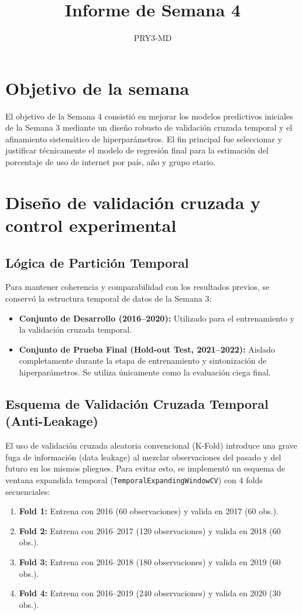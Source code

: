 \documentclass[12pt,a4paper]{article}
\title{Informe de Semana 4}
\author{PRY3-MD}
\date{}
\begin{document}
\maketitle

\section{Objetivo de la semana}

El objetivo de la Semana 4 consistió en mejorar los modelos predictivos iniciales de la Semana 3 mediante un diseño robusto de validación cruzada temporal y el afinamiento sistemático de hiperparámetros. El fin principal fue seleccionar y justificar técnicamente el modelo de regresión final para la estimación del porcentaje de uso de internet por país, año y grupo etario.

\section{Diseño de validación cruzada y control experimental}

\subsection{Lógica de Partición Temporal}
Para mantener coherencia y comparabilidad con los resultados previos, se conservó la estructura temporal de datos de la Semana 3:
\begin{itemize}
    \item \textbf{Conjunto de Desarrollo (2016--2020):} Utilizado para el entrenamiento y la validación cruzada temporal.
    \item \textbf{Conjunto de Prueba Final (Hold-out Test, 2021--2022):} Aislado completamente durante la etapa de entrenamiento y sintonización de hiperparámetros. Se utiliza únicamente como la evaluación ciega final.
\end{itemize}

\subsection{Esquema de Validación Cruzada Temporal (Anti-Leakage)}
El uso de validación cruzada aleatoria convencional (K-Fold) introduce una grave fuga de información (data leakage) al mezclar observaciones del pasado y del futuro en los mismos pliegues. Para evitar esto, se implementó un esquema de ventana expandida temporal (\texttt{TemporalExpandingWindowCV}) con 4 folds secuenciales:
\begin{enumerate}
    \item \textbf{Fold 1:} Entrena con 2016 (60 observaciones) y valida en 2017 (60 obs.).
    \item \textbf{Fold 2:} Entrena con 2016--2017 (120 observaciones) y valida en 2018 (60 obs.).
    \item \textbf{Fold 3:} Entrena con 2016--2018 (180 observaciones) y valida en 2019 (60 obs.).
    \item \textbf{Fold 4:} Entrena con 2016--2019 (240 observaciones) y valida en 2020 (30 obs.).
\end{enumerate}
\end{document}
